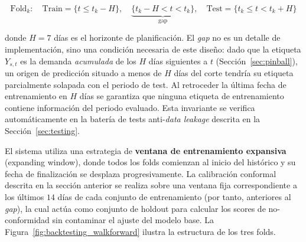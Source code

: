 \begin{equation}
    \text{Fold}_k: \quad \text{Train} = \{t \leq t_k - H\}, \quad
    \underbrace{\{t_k - H < t < t_k\}}_{\text{gap}}, \quad
    \text{Test} = \{t_k \leq t < t_k + H\}
\end{equation}

donde $H = 7$ días es el horizonte de planificación. El \textit{gap} no es un detalle de implementación, sino una condición necesaria de este diseño: dado que la etiqueta $Y_{s,t}$ es la demanda \emph{acumulada} de los $H$ días siguientes a $t$ (Sección~\ref{sec:pinball}), un origen de predicción situado a menos de $H$ días del corte tendría su etiqueta parcialmente solapada con el periodo de test. Al retroceder la última fecha de entrenamiento en $H$ días se garantiza que ninguna etiqueta de entrenamiento contiene información del periodo evaluado. Esta invariante se verifica automáticamente en la batería de tests anti-\textit{data leakage} descrita en la Sección~\ref{sec:testing}.

El sistema utiliza una estrategia de \textbf{ventana de entrenamiento expansiva} (expanding window), donde todos los folds comienzan al inicio del histórico y su fecha de finalización se desplaza progresivamente. La calibración conformal descrita en la sección anterior se realiza sobre una ventana fija correspondiente a los últimos $14$ días de cada conjunto de entrenamiento (por tanto, anteriores al \textit{gap}), la cual actúa como conjunto de holdout para calcular los scores de no-conformidad sin contaminar el ajuste del modelo base. La Figura~\ref{fig:backtesting_walkforward} ilustra la estructura de los tres folds.

